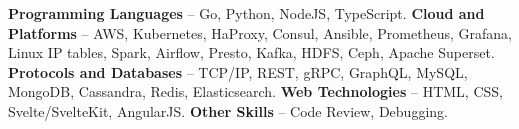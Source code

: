 \textbf{Programming Languages} -- Go, Python, NodeJS, TypeScript. 
\textbf{Cloud and Platforms} -- AWS, Kubernetes, HaProxy, Consul, Ansible, Prometheus, Grafana, Linux IP tables,
Spark, Airflow, Presto, Kafka, HDFS, Ceph, Apache Superset.
\textbf{Protocols and Databases} -- TCP/IP, REST, gRPC, GraphQL, MySQL, MongoDB, Cassandra, Redis, Elasticsearch.
\textbf{Web Technologies} --
HTML, CSS, Svelte/SvelteKit, AngularJS.
\textbf{Other Skills} -- Code Review, Debugging.